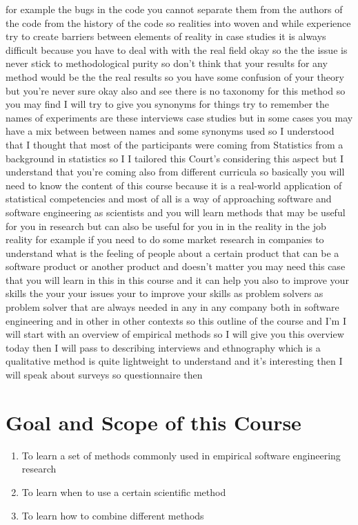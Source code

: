 \documentclass[conference, compsoc, twoside]{IEEEtran}
\begin{document}
for example the bugs in the code you cannot separate them from the authors of the code from the history of the code so realities into woven and while experience try to create barriers between elements of reality in case studies it is always difficult because you have to deal with with the real field okay so the the issue is never stick to methodological purity so don't think that your results for any method would be the the real results so you have some confusion of your theory but you're never sure okay also and see there is no taxonomy for this method so you may find I will try to give you synonyms for things try to remember the names of experiments are these interviews case studies but in some cases you may have a mix between between names and some synonyms used 
so I understood that I thought that most of the participants were coming from Statistics from a background in statistics 
so I I tailored this Court's considering this aspect but I understand that you're coming also from different curricula so basically you will need to know the content of this course because it is a real-world application of statistical competencies and most of all is a way of approaching software and software engineering as scientists and you will learn methods that may be useful for you in research but can also be useful for you in in the reality in the job reality 
for example if you need to do some market research in companies to understand what is the feeling of people about a certain product that can be a software product or another product and doesn't matter you may need this case that you will learn in this in this course and it can help you also to improve your skills the your your issues your to improve your skills as problem solvers as problem solver that are always needed in any in any company both in software engineering and in other in other contexts so this outline of the course and I'm I will start with an overview of empirical methods 
so I will give you this overview today then I will pass to describing interviews and ethnography which is a qualitative method is quite lightweight to understand and it's interesting then I will speak about surveys so questionnaire then 
\section{Goal and Scope of this Course}
    
\begin{enumerate}
\item To learn a set of methods commonly used in empirical software engineering research
\item To learn when to use a certain scientific method
\item To learn how to combine different methods
\end{enumerate}
\end{document}
